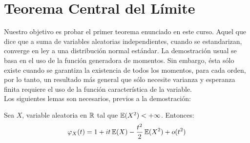 \section{Teorema Central del Límite}
Nuestro objetivo es probar el primer teorema enunciado en este curso. Aquel que dice que a suma de variables aleatorias independientes, cuando se estandarizan, converge en ley a una distribución normal estándar. La demostración usual se basa en el uso de la función generadora de momentos. Sin embargo, ésta sólo existe cuando se garantiza la existencia de todos los momentos, para cada orden, por lo tanto, un resultado más general que sólo necesite varianza y esperanza finita requiere el uso de la función característica de la variable.\\ \newline
Los siguientes lemas son necesarios, previos a la demostración:

\begin{lem} Sea $X$, variable aleatoria en $\mathbb R$ tal que $\mathbb E(X^2) < +\infty$. Entonces:
\[\varphi_X(t) = 1 + it\,\mathbb E(X) - \frac{t^2}{2}\,\mathbb E(X^2) + o(t^2)\]
\end{lem}

